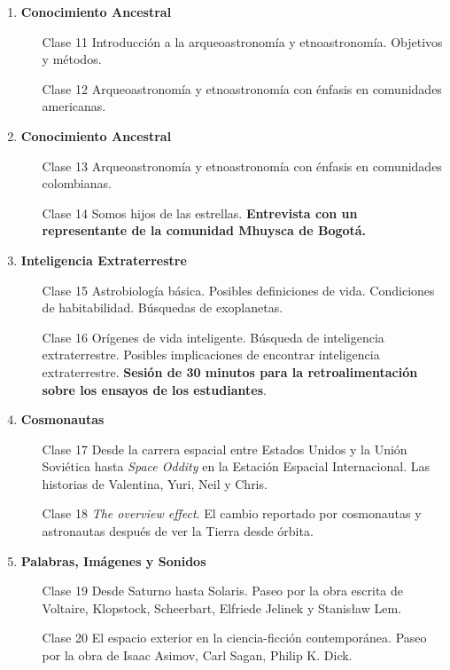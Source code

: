 \documentclass[12pt]{report}
\begin{document}
\begin{enumerate}
\item {\bf Conocimiento Ancestral}
\begin{itemize}
\item[Clase 11] Introducci\'on a la arqueoastronom\'ia y
  etnoastronom\'ia. Objetivos y m\'etodos. 
\item[Clase 12] Arqueoastronom\'ia y etnoastronom\'ia con \'enfasis en
  comunidades americanas.
\end{itemize}

\item {\bf Conocimiento Ancestral}
\begin{itemize}
\item[Clase 13] Arqueoastronom\'ia y etnoastronom\'ia con \'enfasis en
  comunidades colombianas.
\item[Clase 14] Somos hijos de las estrellas. {\bf Entrevista con un
  representante de la comunidad Mhuysca de Bogot\'a.} 
\end{itemize}

\item {\bf Inteligencia Extraterrestre}
\begin{itemize}
\item[Clase 15] Astrobiolog\'ia b\'asica. Posibles definiciones de
  vida. Condiciones de habitabilidad. B\'usquedas de exoplanetas.
\item[Clase 16] Or\'igenes de vida inteligente.  B\'usqueda de
  inteligencia extraterrestre. Posibles implicaciones de encontrar
  inteligencia extraterrestre.
  {\bf Sesi\'on de 30 minutos para la retroalimentaci\'on sobre los
    ensayos de los estudiantes}. 
\end{itemize}

\item {\bf Cosmonautas}
\begin{itemize}
\item[Clase 17] Desde la carrera espacial entre Estados Unidos y la Uni\'on
  Sovi\'etica hasta \emph{Space Oddity} en la Estaci\'on Espacial
  Internacional. Las historias de Valentina, Yuri, Neil y Chris.
\item[Clase 18] \emph{The overview effect}. El cambio reportado por
  cosmonautas y astronautas despu\'es de ver la Tierra desde \'orbita.
\end{itemize}

\item {\bf Palabras, Im\'agenes y Sonidos}
\begin{itemize}
\item[Clase 19] Desde Saturno hasta Solaris. Paseo por la obra escrita
  de Voltaire, Klopstock, Scheerbart, Elfriede Jelinek y Stanis\l aw Lem.
\item[Clase 20] El espacio exterior en la ciencia-ficci\'on
  contempor\'anea. Paseo por la obra de Isaac Asimov, Carl Sagan,
  Philip K. Dick. 
\end{itemize}


\end{enumerate}
\end{document}
